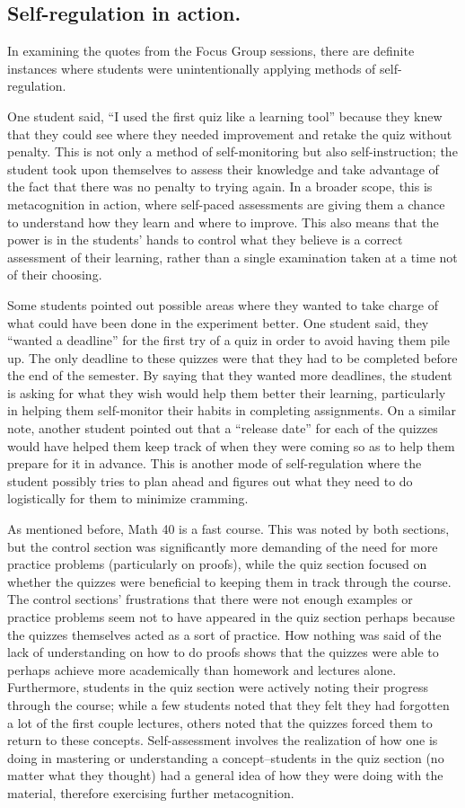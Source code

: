 \subsection{Self-regulation in action.}
In examining the quotes from the Focus Group sessions, there are definite instances where students were unintentionally applying methods of self-regulation.

One student said, ``I used the first quiz like a learning tool'' because they knew that they could see where they needed improvement and retake the quiz without penalty. This is not only a method of self-monitoring but also self-instruction; the student took upon themselves to assess their knowledge and take advantage of the fact that there was no penalty to trying again. In a broader scope, this is metacognition in action, where self-paced assessments are giving them a chance to understand how they learn and where to improve. This also means that the power is in the students' hands to control what they believe is a correct assessment of their learning, rather than a single examination taken at a time not of their choosing.

Some students pointed out possible areas where they wanted to take charge of what could have been done in the experiment better. One student said, they ``wanted a deadline'' for the first try of a quiz in order to avoid having them pile up. The only deadline to these quizzes were that they had to be completed before the end of the semester. By saying that they wanted more deadlines, the student is asking for what they wish would help them better their learning, particularly in helping them self-monitor their habits in completing assignments. On a similar note, another student pointed out that a ``release date'' for each of the quizzes would have helped them keep track of when they were coming so as to help them prepare for it in advance. This is another mode of self-regulation where the student possibly tries to plan ahead and figures out what they need to do logistically for them to minimize cramming.

As mentioned before, Math 40 is a fast course. This was noted by both sections, but the control section was significantly more demanding of the need for more practice problems (particularly on proofs), while the quiz section focused on whether the quizzes were beneficial to keeping them in track through the course. The control sections' frustrations that there were not enough examples or practice problems seem not to have appeared in the quiz section perhaps because the quizzes themselves acted as a sort of practice. How nothing was said of the lack of understanding on how to do proofs shows that the quizzes were able to perhaps achieve more academically than homework and lectures alone. Furthermore, students in the quiz section were actively noting their progress through the course; while a few students noted that they felt they had forgotten a lot of the first couple lectures, others noted that the quizzes forced them to return to these concepts. Self-assessment involves the realization of how one is doing in mastering or understanding a concept--students in the quiz section (no matter what they thought) had a general idea of how they were doing with the material, therefore exercising further metacognition.

